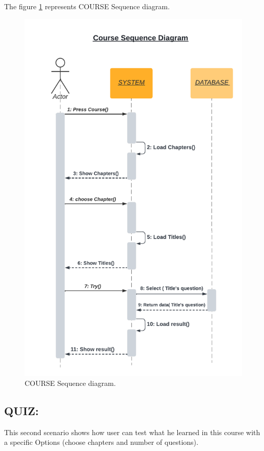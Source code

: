 \newpage
The figure \ref{fig:COURSE DS} represents COURSE Sequence diagram.
\begin{figure}[ht]
	\centering
	\label{}\includegraphics[scale=0.6]{img/Course Sequence diagram.pdf}                
	\caption{COURSE Sequence diagram.} 
	\label{fig:COURSE DS}
\end{figure} 






\subsection{QUIZ:}
This second scenario shows how user can test what he learned in this course with a specific Options (choose chapters and number of questions).
\newpage

